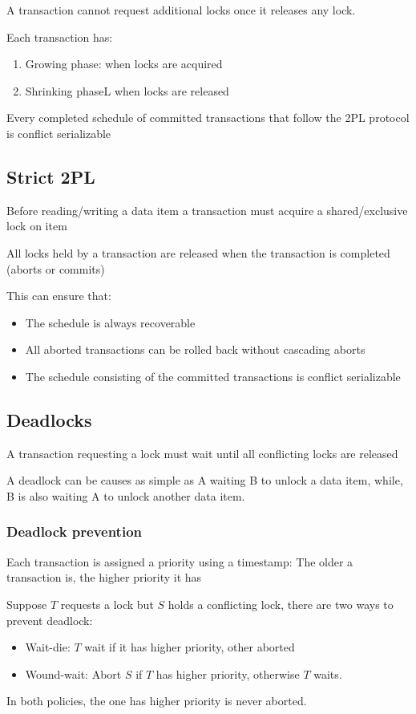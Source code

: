 \documentclass{article}
\begin{document}
A transaction cannot request additional locks once it releases any lock.

Each transaction has:
\begin{enumerate}
  \item Growing phase: when locks are acquired
  \item Shrinking phaseL when locks are released
\end{enumerate}

Every completed schedule of committed transactions that follow the 2PL protocol is conflict serializable

\subsection*{Strict 2PL}

Before reading/writing a data item a transaction must acquire a shared/exclusive lock on item

All locks held by a transaction are released when the transaction is completed (aborts or commits)

This can ensure that:
\begin{itemize}
  \item The schedule is always recoverable
  \item All aborted transactions can be rolled back without cascading aborts
  \item The schedule consisting of the committed transactions is conflict serializable
\end{itemize}

\subsection*{Deadlocks}
A transaction requesting a lock must wait until all conflicting locks are released

A deadlock can be causes as simple as A waiting B to unlock a data item, while, B is also waiting A to unlock another data item.

\subsubsection*{Deadlock prevention}
Each transaction is assigned a priority using a timestamp: The older a transaction is, the higher priority it has

Suppose $T$ requests a lock but $S$ holds a conflicting lock, there are two ways to prevent deadlock:
\begin{itemize}
  \item Wait-die: $T$ wait if it has higher priority, other aborted
  \item Wound-wait: Abort $S$ if $T$ has higher priority, otherwise $T$ waits.
\end{itemize}
In both policies, the one has higher priority is never aborted.
\end{document}
